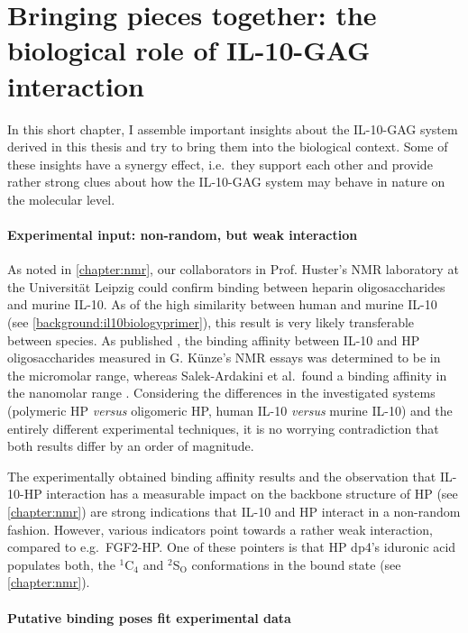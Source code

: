 \chapter{Bringing pieces together: the biological role of IL-10-GAG interaction}
\label{together}

In this short chapter, I assemble important insights about the IL-10-GAG system
derived in this thesis and try to bring them into the biological context. Some
of these insights have a synergy effect, i.e.\ they support each other and
provide rather strong clues about how the IL-10-GAG system may behave in nature
on the molecular level.


\subsubsection{Experimental input: non-random, but weak interaction}

As noted in \cref{chapter:nmr}, our collaborators in Prof. Huster's NMR
laboratory at the Universität Leipzig could confirm binding between heparin
oligosaccharides and murine IL-10. As of the high similarity between human and
murine IL-10 (see \cref{background:il10biologyprimer}), this result is very
likely transferable between species. As published \cite{kuenze_gehrcke_2014},
the binding affinity between IL-10 and HP oligosaccharides measured in G.
Künze's NMR essays was determined to be in the micromolar range, whereas
Salek-Ardakini et al.\ found a binding affinity in the nanomolar range
\cite{salek_ardakani_2000}. Considering the differences in the investigated
systems (polymeric HP \textit{versus} oligomeric HP, human IL-10 \textit{versus}
murine IL-10) and the entirely different experimental techniques, it is no
worrying contradiction that both results differ by an order of magnitude.

The experimentally obtained binding affinity results and the observation that
IL-10-HP interaction has a measurable impact on the backbone structure of HP
(see \cref{chapter:nmr}) are strong indications that IL-10 and HP interact in a
non-random fashion. However, various indicators point towards a rather weak
interaction, compared to e.g.\ FGF2-HP. One of these pointers is that HP dp4's
iduronic acid populates both, the ${}^1$C${}_4$ and ${}^2$S${}_\mathrm{O}$
conformations in the bound state (see \cref{chapter:nmr}).


\subsubsection{Putative binding poses fit experimental data}

